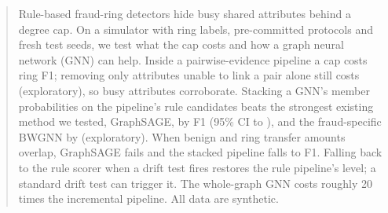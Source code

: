 \begin{abstract}
Rule-based fraud-ring detectors hide busy shared attributes behind a degree
cap. On a simulator with ring labels, pre-committed protocols and fresh test
seeds, we test what the cap costs and how a graph neural network
(GNN) can help. Inside a pairwise-evidence pipeline a cap costs \RfCapD{} ring F1;
removing only attributes unable to link a pair alone still costs
\RtCapTwentySevenA{} (exploratory), so busy attributes corroborate. Stacking a GNN's member probabilities on the pipeline's rule
candidates beats the strongest existing method we tested, GraphSAGE, by \AnTOneVsgnnunscoredA{}
F1 (95\% CI \AnTOneVsgnnunscoredLo{} to \AnTOneVsgnnunscoredHi{}), and the fraud-specific
BWGNN by \BwAnchorBwA{} (exploratory). When benign and ring transfer amounts overlap, GraphSAGE fails
and the stacked pipeline falls to \AnTTwosagepipeF{} F1. Falling back to the rule scorer
when a drift test fires restores the rule pipeline's level; a standard drift test
can trigger it. The whole-graph GNN costs roughly 20 times the incremental
pipeline. All data are synthetic.
\end{abstract}
